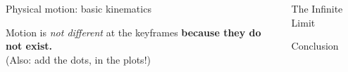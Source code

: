 \documentclass[final,t]{beamer}\usepackage[]{graphicx}\usepackage[]{color}
\newenvironment{knitrout}{}{} %
\begin{document}
\begin{frame}[fragile]
\begin{columns}[T,onlytextwidth]
\begin{column}{.32\linewidth}
\begin{block}{Physical motion: basic kinematics}
\begin{knitrout}
\end{knitrout}

        Motion is \textit{not different} at the keyframes
        \textbf{because they do not exist.}
        \\ \tiny (Also: add the dots, in the plots!)
      \end{block}

    \end{column}

    \begin{column}{.32\linewidth}

      \begin{block}{The Infinite Limit}
      \end{block}

      \begin{block}{Conclusion}
      \end{block}

    \end{column}

  \end{columns}


\end{frame}
\end{document}
